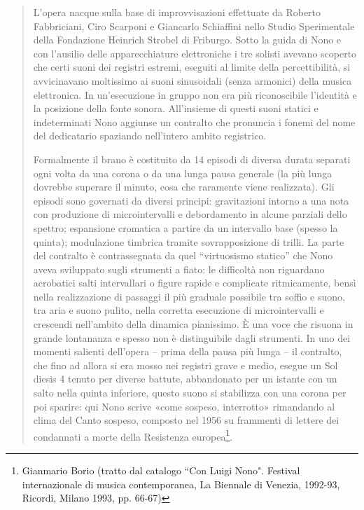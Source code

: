 \begin{quote}
L’opera nacque sulla base di improvvisazioni effettuate da Roberto Fabbriciani, Ciro Scarponi e Giancarlo Schiaffini nello Studio Sperimentale della Fondazione Heinrich Strobel di Friburgo. Sotto la guida di Nono e con l’ausilio delle apparecchiature elettroniche i tre solisti avevano scoperto che certi suoni dei registri estremi, eseguiti al limite della percettibilità, si avvicinavano moltissimo ai suoni sinusoidali (senza armonici) della musica elettronica. In un’esecuzione in gruppo non era più riconoscibile l’identità e la posizione della fonte sonora. All’insieme di questi suoni statici e indeterminati Nono aggiunse un contralto che pronuncia i fonemi del nome del dedicatario spaziando nell’intero ambito registrico.

Formalmente il brano è costituito da 14 episodi di diversa durata separati ogni volta da una corona o da una lunga pausa generale (la più lunga dovrebbe superare il minuto, cosa che raramente viene realizzata). Gli episodi sono governati da diversi principi: gravitazioni intorno a una nota con produzione di microintervalli e debordamento in alcune parziali dello spettro; espansione cromatica a partire da un intervallo base (spesso la quinta); modulazione timbrica tramite sovrapposizione di trilli. La parte del contralto è contrassegnata da quel “virtuosismo statico” che Nono aveva sviluppato sugli strumenti a fiato: le difficoltà non riguardano acrobatici salti intervallari o figure rapide e complicate ritmicamente, bensì nella realizzazione di passaggi il più graduale possibile tra soffio e suono, tra aria e suono pulito, nella corretta esecuzione di microintervalli e crescendi nell’ambito della dinamica pianissimo. È una voce che risuona in grande lontananza e spesso non è distinguibile dagli strumenti. In uno dei momenti salienti dell’opera – prima della pausa più lunga – il contralto, che fino ad allora si era mosso nei registri grave e medio, esegue un Sol diesis 4 tenuto per diverse battute, abbandonato per un istante con un salto nella quinta inferiore, questo suono si stabilizza con una corona per poi sparire: qui Nono scrive «come sospeso, interrotto» rimandando al clima del Canto sospeso, composto nel 1956 su frammenti di lettere dei condannati a morte della Resistenza europea\footnote{Gianmario Borio
 (tratto dal catalogo “Con Luigi Nono". Festival internazionale di musica contemporanea, La Biennale di Venezia, 1992-93, Ricordi, Milano 1993, pp. 66-67)}.
\end{quote}

